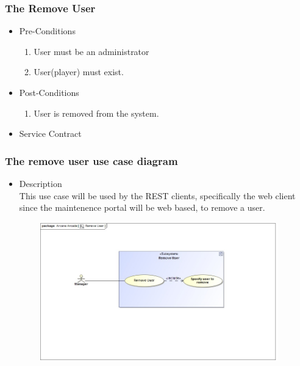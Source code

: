 \documentclass[english]{article}
\begin{document}
		
		\subsubsection{The Remove User}
		
			\begin{itemize}
	
		
		\item Pre-Conditions
			\begin{enumerate}
				\item User must be an administrator
				\item User(player) must exist.
			\end{enumerate}
		\item Post-Conditions
			\begin{enumerate}
			\item User is removed from the system.
						
			\end{enumerate}
		\item Service Contract
			\begin{figure}
			
			\end{figure}

		\end{itemize}
		
		
		\subsubsection* {The remove user use case diagram}
		\begin{itemize}
			\item Description\\
			This use case will be used by the REST clients, specifically the web client since the maintenence 					portal will be web based, to remove a user.
		\end{itemize}
		
	
		\includegraphics[width=14cm,height=6cm,keepaspectratio]{removeUser.jpg}
		
\end{document}

